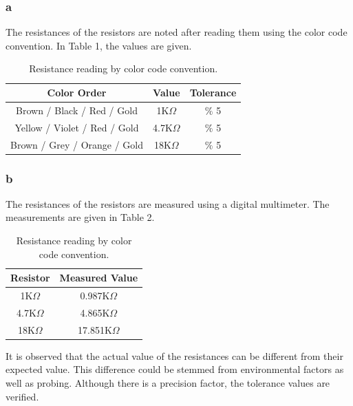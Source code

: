 \documentclass[letterpaper,12pt]{article}
\begin{document}
\subsubsection{a} 
The resistances of the resistors are noted after reading them using the color code convention. In Table 1, the values are given. 
\begin{table}[H]
\begin{center}
	\caption{Resistance reading by color code convention.}
	\vspace{2mm}
	\begin{tabular}{||c | c | c||} 
	 \hline
	 Color Order & Value & Tolerance \\ [0.5ex] 
	 \hline\hline
	 Brown / Black / Red / Gold & 1K\( \Omega \) & \( \% \) 5  \\ 
	 \hline
	 Yellow / Violet / Red / Gold & 4.7K\( \Omega \) & \( \% \) 5   \\
	 \hline
	 Brown / Grey / Orange / Gold & 18K\( \Omega \) & \( \% \) 5  \\ [1ex] 
	 \hline
	\end{tabular}
\end{center}
\end{table}

\subsubsection{b} 
The resistances of the resistors are measured using a digital multimeter. The measurements are given in Table 2.
\begin{table}[H]
	\begin{center}
		\caption{Resistance reading by color code convention.}
		\vspace{2mm}

		\begin{tabular}{||c | c ||} 
		 \hline
		 Resistor & Measured Value \\ [0.5ex] 
		 \hline\hline
		 1K\( \Omega \) & 0.987K\( \Omega \)  \\ 
		 \hline
	     4.7K\( \Omega \) & 4.865K\( \Omega \)   \\
		 \hline
		 18K\( \Omega \) & 17.851K\( \Omega \)  \\ [1ex] 
		 \hline
		\end{tabular}
	\end{center}
	\end{table}
	

It is observed that the actual value of the resistances can be different from their expected value. This difference could be stemmed from environmental factors as well as probing. Although there is a precision factor, the tolerance values are verified. 
\end{document}
